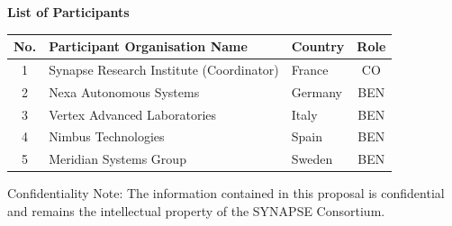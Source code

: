 \documentclass[11pt,a4paper]{article}
\begin{document}
\begin{center}
    {\large\bfseries List of Participants}\\[5mm]
    \begin{tabularx}{0.9\textwidth}{c X l c}
        \toprule
        \textbf{No.} & \textbf{Participant Organisation Name} & \textbf{Country} & \textbf{Role} \\
        \midrule
        1 & Synapse Research Institute (Coordinator) & France & CO \\
        2 & Nexa Autonomous Systems & Germany & BEN \\
        3 & Vertex Advanced Laboratories & Italy & BEN \\
        4 & Nimbus Technologies & Spain & BEN \\
        5 & Meridian Systems Group & Sweden & BEN \\
        \bottomrule
    \end{tabularx}
    
    \vfill
    {\small Confidentiality Note: The information contained in this proposal is confidential and remains the intellectual property of the SYNAPSE Consortium.}
\end{center}

\newpage
\tableofcontents
\newpage





\end{document}
